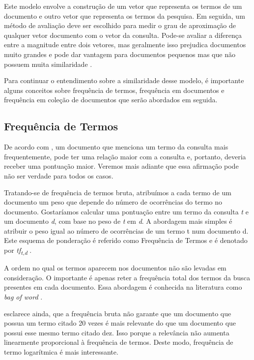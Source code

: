 Este modelo envolve a construção de um vetor que representa os termos de um documento e outro vetor que representa os termos da pesquisa. Em seguida, um método de avaliação deve ser escolhido para medir o grau de aproximação de qualquer vetor documento com o vetor da consulta. Pode-se avaliar a diferença entre a magnitude entre dois vetores, mas geralmente isso prejudica documentos muito grandes e pode dar vantagem para documentos pequenos mas que não possuem muita similaridade \citep{Croft2010}.

Para continuar o entendimento sobre a similaridade desse modelo, é importante alguns conceitos sobre frequência de termos, frequência em documentos e frequência em coleção de documentos que serão abordados em seguida.

\subsection{Frequência de Termos}

De acordo com \cite{Manning2008}, um documento que menciona um termo da consulta mais frequentemente, pode ter uma relação maior com a consulta e, portanto, deveria receber uma pontuação maior. Veremos mais adiante que essa afirmação pode não ser verdade para todos os casos.

Tratando-se de frequência de termos bruta, atribuímos a cada termo de um documento um peso que depende do número de ocorrências do termo no documento. Gostaríamos calcular uma pontuação entre um termo da consulta \textit{t} e um documento \textit{d}, com base no peso de \textit{t} em \textit{d}. A abordagem mais simples é atribuir o peso igual ao número de ocorrências de um termo t num documento d. Este esquema de ponderação é referido como Frequência de Termos e é denotado por \textit{tf\textsubscript{t,d}} \citep{Manning2008}.

A ordem no qual os termos aparecem nos documentos não são levadas em consideração. O importante é apenas reter a frequência total dos termos da busca presentes em cada documento. Essa abordagem é conhecida na literatura como \textit{bag of word} \citep{Croft2010}.

\cite{Manning2008} esclarece ainda, que a frequência bruta não garante que um documento que possua um termo citado 20 vezes é mais relevante do que um documento que possui esse mesmo termo citado dez. Isso porque a relevância não aumenta linearmente proporcional à frequência de termos. Deste modo, frequência de termo logarítmica é mais interessante.

